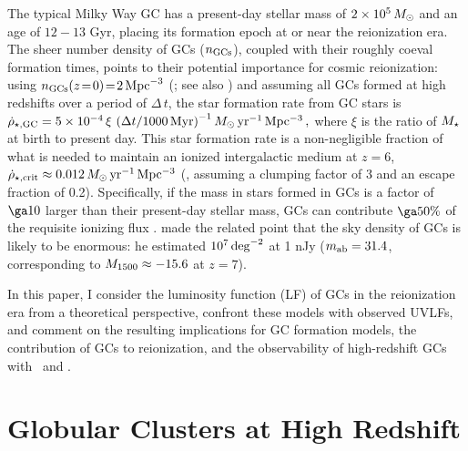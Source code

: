 \documentclass[fleqn,usenatbib]{mnras}
\begin{document}
The typical Milky Way GC has a present-day stellar mass of $2\times 10^5\,M_{\odot}$
and an age of $12-13$ Gyr, placing its formation epoch at or near the
reionization era. The sheer number density of GCs ($n_{\rm GCs}$), coupled with
their roughly coeval formation times, points to their potential importance for
cosmic reionization: using $n_{\rm GCs}(z\!=\!0)\!=\!2\,{\rm Mpc}^{-3}$
(\citealt[hereafter B17]{boylan-kolchin2017}; see also
\citealt{portegies-zwart2000}) and assuming all GCs formed at high redshifts
over a period of $\Delta\,t$, the star formation rate from GC stars is
$\dot{\rho}_{\rm \star, GC}=5\times 10^{-4}\,\xi\,\left({\Delta t/1000\,{\rm
      Myr}}\right)^{-1} M_{\odot}\, {\rm yr^{-1} \,Mpc^{-3}}\,,$ where $\xi$ is the
ratio of $M_{\star}$ at birth to present day. This star formation rate is a
non-negligible fraction of what is needed to maintain an ionized intergalactic
medium at $z=6$,
$\dot{\rho}_{\rm \star, crit} \approx 0.012 \,M_{\odot}\, {\rm yr^{-1} \,Mpc^{-3}}$
(\citealt{shull2012}, assuming a clumping factor of 3 and an escape fraction of
0.2). Specifically, if the mass in stars formed in GCs is a factor of $\ga 10$
larger than their present-day stellar mass, GCs can contribute $\ga 50\%$ of the
requisite ionizing flux \citep{ricotti2002, schaerer2011,
  katz2014}. \citet{carlberg2002} made the related point that the sky density of
GCs is likely to be enormous: he estimated $10^7\,{\rm deg}^{-2}$ at 1 nJy
($m_{\rm ab}=31.4$, corresponding to ${M_{\rm 1500}} \approx -15.6$ at $z=7$).

In this paper, I consider the luminosity function (LF) of GCs in the
reionization era from a theoretical perspective, confront these models with
observed UVLFs, and comment on the resulting implications for GC formation
models, the contribution of GCs to reionization, and the observability of
high-redshift GCs with \hst\ and \jwst.

\section{Globular Clusters at High Redshift}
\label{sec:model}
\end{document}
